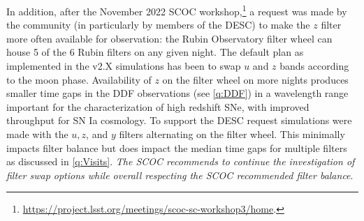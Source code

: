 In addition, after the November 2022 SCOC workshop,\footnote{\url{https://project.lsst.org/meetings/scoc-sc-workshop3/home}.} a request was made by the community (in particularly by members of the DESC) to make the $z$  filter more often available for observation: the Rubin Observatory filter wheel can house 5 of the 6 Rubin filters on any given night. The default plan as implemented in the v2.X simulations has been to swap $u$ and $z$ bands according to the moon phase. Availability of $z$ on the filter wheel on more nights produces smaller time gaps in the DDF observations (see \autoref{q:DDF}) in a wavelength range important for the characterization of high redshift SNe, with improved throughput for SN Ia cosmology. To support the DESC request simulations were made with the $u, z$, and $y$ filters alternating on the filter wheel. This minimally impacts filter balance but does impact the median time gaps for multiple filters as discussed in \autoref{q:Visits}. \emph{The SCOC recommends to continue the investigation of filter swap options while overall respecting the SCOC recommended filter balance}. 
